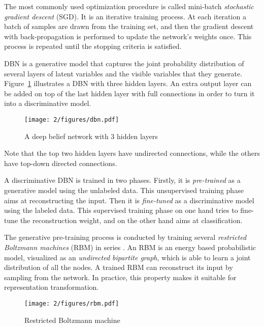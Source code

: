 The most commonly used optimization procedure is called mini-batch {\it stochastic gradient descent} (SGD). It is an iterative training process. At each iteration a batch of samples are drawn from the training set, and then the gradient descent with back-propagation is performed to update the network's weights once. This process is repeated until the stopping criteria is satisfied.


DBN is a generative model that captures the joint probability distribution of several layers of latent variables and the visible variables that they generate. Figure~\ref{fig:2-dbn} illustrates a DBN with three hidden layers. An extra output layer can be added on top of the last hidden layer with full connections in order to turn it into a discriminative model.
\begin{figure}[htb]
\centering
\texttt{[image: 2/figures/dbn.pdf]}
\caption{A deep belief network with 3 hidden layers}
\label{fig:2-dbn}
\end{figure}
Note that the top two hidden layers have undirected connections, while the others have top-down directed connections.

A discriminative DBN is trained in two phases. Firstly, it is {\it pre-trained} as a generative model using the unlabeled data. This unsupervised training phase aims at reconstructing the input. Then it is {\it fine-tuned} as a discriminative model using the labeled data. This supervised training phase on one hand tries to fine-tune the reconstruction weight, and on the other hand aims at classification.

The generative pre-training process is conducted by training several {\it restricted Boltzmann machines} (RBM) in series \cite{hinton2006fast}. An RBM \cite{smolensky1986information} is an energy based probabilistic model, visualized as an {\it undirected bipartite graph}, which is able to learn a joint distribution of all the nodes. A trained RBM can reconstruct its input by sampling from the network. In practice, this property makes it suitable for representation transformation.
\begin{figure}[htb]
\centering
\texttt{[image: 2/figures/rbm.pdf]}
\caption{Restricted Boltzmann machine}
\label{fig:2-rbm}
\end{figure}

